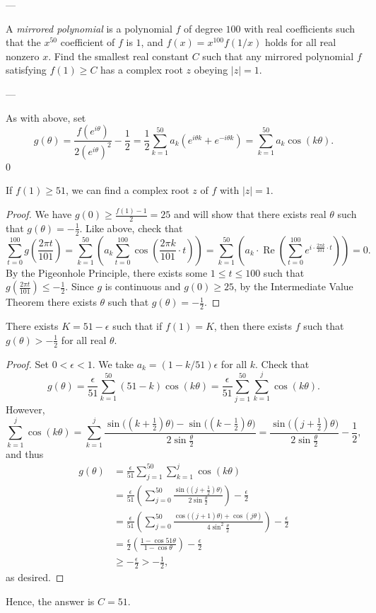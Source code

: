 
---

A \emph{mirrored polynomial} is a polynomial $f$ of degree $100$ with real coefficients such that the $x^{50}$ coefficient of $f$ is $1$, and $f(x)=x^{100}f(1/x)$ holds for all real nonzero $x$. Find the smallest real constant $C$ such that any mirrored polynomial $f$ satisfying $f(1)\ge C$ has a complex root $z$ obeying $|z|=1$.

---

As with above, set $$g(\theta)=\frac{f(e^{i\theta})}{2(e^{i\theta})^2}-\frac12=\frac12\sum_{k=1}^{50}a_k\left(e^{i\theta k}+e^{-i\theta k}\right)=\sum_{k=1}^{50}a_k\cos(k\theta).$$
\setcounter{iclaim}0
\begin{iclaim}
    If $f(1)\ge 51$, we can find a complex root $z$ of $f$ with $|z|=1$.
\end{iclaim}
\begin{proof}
    We have $g(0)\ge\tfrac{f(1)-1}2=25$ and will show that there exists real $\theta$ such that $g(\theta)=-\tfrac12$. Like above, check that $$\sum_{t=0}^{100}g\left(\frac{2\pi t}{101}\right)=\sum_{k=1}^{50}\left(a_k\sum_{t=0}^{100}\cos\left(\frac{2\pi k}{101}\cdot t\right)\right)=\sum_{k=1}^{50}\left(a_k\cdot\operatorname{Re}\left(\sum_{t=0}^{100}e^{i\cdot\frac{2\pi k}{101}\cdot t}\right)\right)=0.$$
    By the Pigeonhole Principle, there exists some $1\le t\le 100$ such that $g(\tfrac{2\pi t}{101})\le-\frac12$. Since $g$ is continuous and $g(0)\ge 25$, by the Intermediate Value Theorem there exists $\theta$ such that $g(\theta)=-\tfrac12$.
\end{proof}
\begin{iclaim}
    There exists $K=51-\epsilon$ such that if $f(1)=K$, then there exists $f$ such that $g(\theta)>-\tfrac12$ for all real $\theta$.
\end{iclaim}
\begin{proof}
    Set $0<\epsilon<1$. We take $a_k=(1-k/51)\epsilon$ for all $k$. Check that $$g(\theta)=\frac{\epsilon}{51}\sum_{k=1}^{50}(51-k)\cos(k\theta)=\frac{\epsilon}{51}\sum_{j=1}^{50}\sum_{k=1}^j\cos(k\theta).$$
    However, $$\sum_{k=1}^j\cos(k\theta)=\sum_{k=1}^j\frac{\sin\big((k+\tfrac12)\theta\big)-\sin\big((k-\tfrac12)\theta\big)}{2\sin\tfrac\theta2}=\frac{\sin\big((j+\tfrac12)\theta\big)}{2\sin\tfrac\theta2}-\frac12,$$
    and thus
    \begin{align*}
        g(\theta)&=\frac{\epsilon}{51}\sum_{j=1}^{50}\sum_{k=1}^j\cos(k\theta)\\
        &=\frac{\epsilon}{51}\left(\sum_{j=0}^{50}\frac{\sin\big((j+\tfrac12)\theta\big)}{2\sin\tfrac\theta2}\right)-\frac\epsilon2\\
        &=\frac{\epsilon}{51}\left(\sum_{j=0}^{50}\frac{\cos\big((j+1)\theta\big)+\cos(j\theta)}{4\sin^2\tfrac\theta2}\right)-\frac\epsilon2\\
        &=\frac\epsilon2\left(\frac{1-\cos51\theta}{1-\cos\theta}\right)-\frac\epsilon2\\
        &\ge-\frac\epsilon2>-\frac12,
    \end{align*}
    as desired.
\end{proof}
Hence, the answer is $C=51$.

